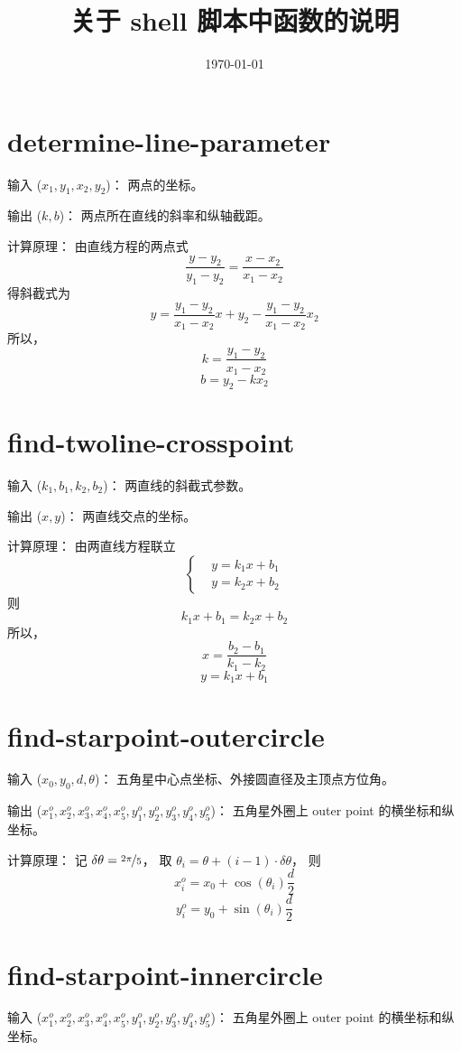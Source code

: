 \documentclass[UTF8]{ctexart}
\title{关于 shell 脚本中函数的说明}
\author{}
\date{\today}
\begin{document}
\maketitle

\section{determine-line-parameter}
输入 ($x_1, y_1, x_2, y_2$)：
两点的坐标。

输出 ($k, b$)：
两点所在直线的斜率和纵轴截距。

计算原理：
由直线方程的两点式
\[ \frac{y - y_2}{y_1 - y_2} = \frac{x - x_2}{x_1 - x_2} \]
得斜截式为
\[ y = \frac{y_1 - y_2}{x_1 - x_2}x + y_2 - \frac{y_1 - y_2}{x_1 - x_2}x_2 \]
所以，
\[ k = \frac{y_1 - y_2}{x_1 - x_2} \]
\[ b = y_2 - k x_2 \]

\section{find-twoline-crosspoint}
输入 ($k_1, b_1, k_2, b_2$)：
两直线的斜截式参数。

输出 ($x, y$)：
两直线交点的坐标。

计算原理：
由两直线方程联立
\[ \left\{
  \begin{aligned}
    & y = k_1 x + b_1 \\
    & y = k_2 x + b_2
  \end{aligned}
\right. \]
则
\[ k_1 x + b_1 = k_2 x + b_2 \]
所以，
\[ x = \frac{b_2 - b_1}{k_1 - k_2} \]
\[ y = k_1 x + b_1 \]

\section{find-starpoint-outercircle}
输入 ($x_0, y_0, d, \theta$)：
五角星中心点坐标、外接圆直径及主顶点方位角。

输出 ($x_1^o, x_2^o, x_3^o, x_4^o, x_5^o,
y_1^o, y_2^o, y_3^o, y_4^o, y_5^o$)：
五角星外圈上 outer point 的横坐标和纵坐标。

计算原理：
记 $\delta\theta = \nicefrac{2 \pi}{5}$，
取 $\theta_i = \theta + (i - 1) \cdot \delta\theta$，
则
\[ x_i^o = x_0 + \cos(\theta_i) \frac{d}{2} \]
\[ y_i^o = y_0 + \sin(\theta_i) \frac{d}{2} \]

\section{find-starpoint-innercircle}
输入 ($x_1^o, x_2^o, x_3^o, x_4^o, x_5^o,
y_1^o, y_2^o, y_3^o, y_4^o, y_5^o$)：
五角星外圈上 outer point 的横坐标和纵坐标。
\end{document}
